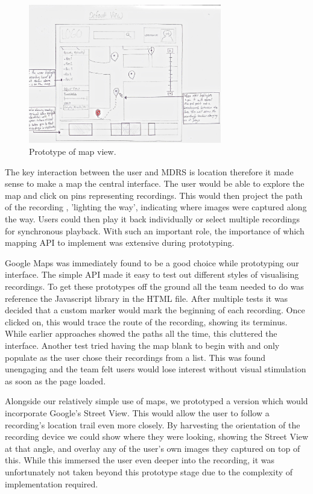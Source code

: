 \documentclass{l3proj}
\begin{document}
\begin{figure}[ht!]
\centering
\includegraphics[width=0.75\textwidth]{images/web-map-view.jpg}
\caption{Prototype of map view.}
\end{figure}

The key interaction between the user and MDRS is location therefore it made sense to make a map the central interface. The user would be able to explore the map and click on pins representing recordings. This would then project the path of the recording , 'lighting the way', indicating where images were captured along the way. Users could then play it back individually or select multiple recordings for synchronous playback. With such an important role, the importance of which mapping API to implement was extensive during prototyping.

Google Maps was immediately found to be a good choice while prototyping our interface. The simple API made it easy to test out different styles of visualising recordings. To get these prototypes off the ground all the team needed to do was  reference the Javascript library in the HTML file. After multiple tests it was decided that a custom marker would mark the beginning of each recording. Once clicked on, this would trace the route of the recording, showing its terminus. While earlier approaches showed the paths all the time, this cluttered the interface. Another test tried having the map blank to begin with and only populate as the user chose their recordings from a list. This was found unengaging and the team felt users would lose interest without visual stimulation as soon as the page loaded.

Alongside our relatively simple use of maps, we prototyped a version which would incorporate Google's Street View. This would allow the user to follow a recording's location trail even more closely. By harvesting the orientation of the recording device we could show where they were looking, showing the Street View at that angle, and overlay any of the user's own images they captured on top of this. While this immersed the user even deeper into the recording, it was unfortunately not taken beyond this prototype stage due to the complexity of implementation required.
\end{document}
